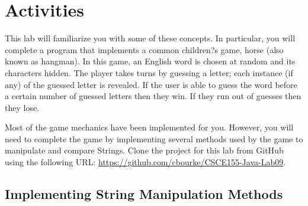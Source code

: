 \documentclass[12pt]{scrartcl}
\begin{document}
\section{Activities}

This lab will familiarize you with some of these concepts.  In particular, you 
will complete a program that implements a common children?s game, horse 
(also known as hangman).  In this game, an English word is chosen at random 
and its characters hidden.  The player takes turns by guessing a letter; each 
instance (if any) of the guessed letter is revealed.  If the user is able to guess 
the word before a certain number of guessed letters then they win.  If they run 
out of guesses then they lose.

Most of the game mechanics have been implemented for you.  However, you 
will need to complete the game by implementing several methods used by the 
game to manipulate and compare Strings.  Clone the project for this lab from
GitHub using the following URL: \url{https://github.com/cbourke/CSCE155-Java-Lab09}.

\subsection{Implementing String Manipulation Methods}
\end{document}
